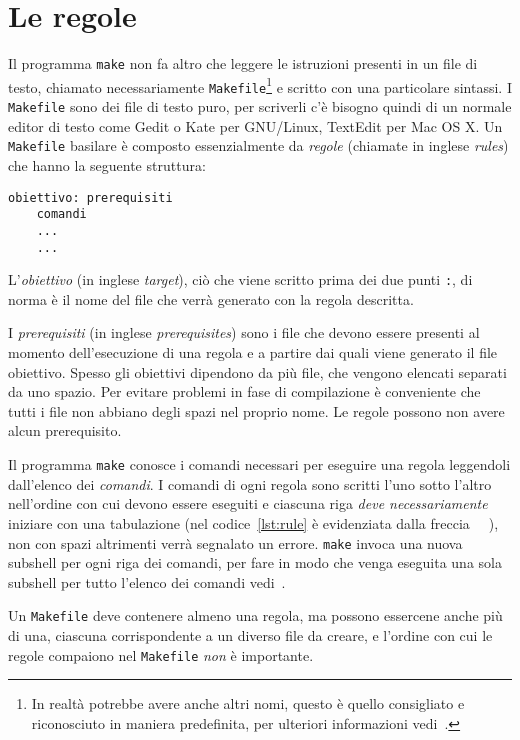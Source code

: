 \section{Le regole}
\label{sec:le-regole}

Il programma \texttt{make} non fa altro che leggere le istruzioni presenti in un
file di testo, chiamato necessariamente
\texttt{Makefile}\footnote{In realtà potrebbe avere anche altri nomi, questo è
  quello consigliato e riconosciuto in maniera predefinita, per ulteriori
  informazioni vedi~\cite[pagina 12]{gnu:make}.}
e scritto con una particolare sintassi.  I \texttt{Makefile} sono dei file di
testo puro, per scriverli c'è bisogno quindi di un normale editor di testo come
Gedit o Kate per GNU/Linux, TextEdit per Mac OS X.  Un \texttt{Makefile}
basilare è composto essenzialmente da \emph{regole} (chiamate in inglese
\emph{rules}) che hanno la seguente struttura:
\begin{lstlisting}[showtabs=true,tab=\rightarrowfill,caption={Struttura di una
regola.},label=lst:rule]
obiettivo: prerequisiti
	comandi
	...
	...
\end{lstlisting}
L'\emph{obiettivo} (in inglese \emph{target}), ciò che viene scritto prima dei
due punti \texttt{:}, di norma è il nome del file che verrà generato con la
regola descritta.

I \emph{prerequisiti} (in inglese \emph{prerequisites}) sono i file che devono
essere presenti al momento dell'esecuzione di una regola e a partire dai quali
viene generato il file obiettivo.  Spesso gli obiettivi dipendono da più file,
che vengono elencati separati da uno spazio.  Per evitare problemi in fase di
compilazione è conveniente che tutti i file non abbiano degli spazi nel proprio
nome.  Le regole possono non avere alcun prerequisito.

Il programma \texttt{make} conosce i comandi necessari per eseguire una regola
leggendoli dall'elenco dei \emph{comandi}.  I comandi di ogni regola sono
scritti l'uno sotto l'altro nell'ordine con cui devono essere eseguiti e
ciascuna riga \emph{deve necessariamente} iniziare con una tabulazione (nel
codice~\ref{lst:rule} è evidenziata dalla freccia
\lstinline[showtabs=true,tab=\rightarrowfill]{	}), non con spazi altrimenti
verrà segnalato un errore.  \texttt{make} invoca una nuova subshell per ogni
riga dei comandi, per fare in modo che venga eseguita una sola subshell per
tutto l'elenco dei comandi vedi~\cite[pagina 44]{gnu:make}.

Un \texttt{Makefile} deve contenere almeno una regola, ma possono essercene
anche più di una, ciascuna corrispondente a un diverso file da creare, e
l'ordine con cui le regole compaiono nel \texttt{Makefile} \emph{non} è
importante.

